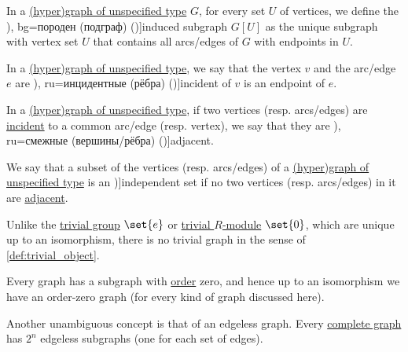\begin{definition}\label{def:induced_subgraph}
  In a \hyperref[rem:graph_of_unspecified_type]{(hyper)graph of unspecified type} \( G \), for every set \( U \) of vertices, we define the \term[ru=порождённый (подграф) (\cite[17]{ЕмеличевИПр1990ТеорияГрафов}), bg=породен (подграф) (\cite[18]{Мирчев2001Графи})]{induced subgraph} \( G[U] \) as the unique subgraph with vertex set \( U \) that contains all arcs/edges of \( G \) with endpoints in \( U \).
\end{definition}

\begin{definition}\label{def:graph_incidence}
  In a \hyperref[rem:graph_of_unspecified_type]{(hyper)graph of unspecified type}, we say that the vertex \( v \) and the arc/edge \( e \) are \term[bg=инцидентни (ребра) (\cite[7]{Мирчев2001Графи}), ru=инцидентные (рёбра) (\cite[9]{ЕмеличевИПр1990ТеорияГрафов})]{incident} of \( v \) is an endpoint of \( e \).
\end{definition}

\begin{definition}\label{def:graph_adjacency}
  In a \hyperref[rem:graph_of_unspecified_type]{(hyper)graph of unspecified type}, if two vertices (resp. arcs/edges) are \hyperref[def:graph_incidence]{incident} to a common arc/edge (resp. vertex), we say that they are \term[bg=съседни (върхове/дъги/ребра) (\cite[7]{Мирчев2001Графи}), ru=смежные (вершины/рёбра) (\cite[9]{ЕмеличевИПр1990ТеорияГрафов})]{adjacent}.
\end{definition}

\begin{definition}\label{def:graph_independent_set}
  We say that a subset of the vertices (resp. arcs/edges) of a \hyperref[rem:graph_of_unspecified_type]{(hyper)graph of unspecified type} is an \term[bg=независимо множество (\cite[103]{Мирчев2001Графи})]{independent set} if no two vertices (resp. arcs/edges) in it are \hyperref[def:graph_adjacency]{adjacent}.
\end{definition}

\begin{remark}\label{rem:trivial_graph}
  Unlike the \hyperref[def:group/trivial]{trivial group} \( \set{ e } \) or \hyperref[def:module/trivial]{trivial \( R \)-module} \( \set{ 0 } \), which are unique up to an isomorphism, there is no trivial graph in the sense of \cref{def:trivial_object}.

  Every graph has a subgraph with \hyperref[def:graph_cardinality/order]{order} zero, and hence up to an isomorphism we have an order-zero graph (for every kind of graph discussed here).

  Another unambiguous concept is that of an edgeless graph. Every \hyperref[def:complete_graph]{complete graph} has \( 2^n \) edgeless subgraphs (one for each set of edges).
\end{remark}

